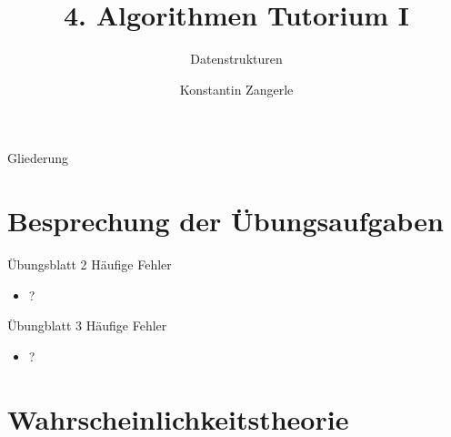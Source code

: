\documentclass[18pt]{beamer}
\title[Algo I Tut]{4. Algorithmen Tutorium I}
\subtitle{Datenstrukturen}
\author[Zangerle]{Konstantin Zangerle}
\institute{Institut für Theoretische Informatik}
\begin{document}

\begin{frame}
\titlepage
\end{frame}

\begin{frame}{Gliederung}
 \tableofcontents
\end{frame}


\section{Besprechung der Übungsaufgaben}
\begin{frame}{Übungsblatt 2}
Häufige Fehler
\begin{itemize}
 \item ?
\end{itemize}

\end{frame}

\begin{frame}{Übungblatt 3}
Häufige Fehler
\begin{itemize}
 \item ?
\end{itemize}

\end{frame}

\section{Wahrscheinlichkeitstheorie}
\end{document}

